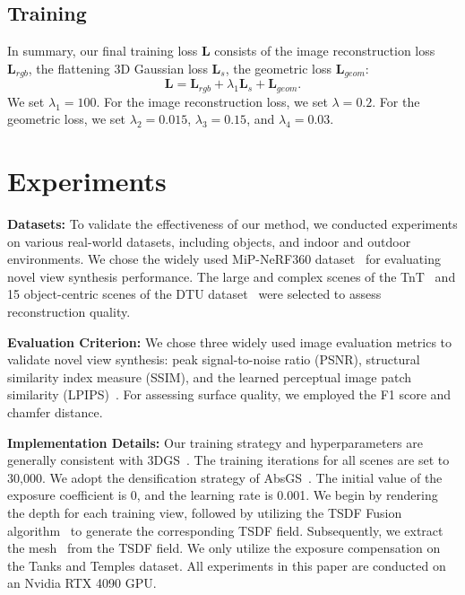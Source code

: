 \documentclass[lettersize,journal]{IEEEtran}
\begin{document}
\subsection{Training}
In summary, our final training loss $\bm{L}$ consists of the image reconstruction loss $\bm{L}_{rgb}$, the flattening 3D Gaussian loss $\bm{L}_{s}$, the geometric loss $\bm{L}_{geom}$:
\begin{equation}
    \bm{L}=\bm{L}_{rgb}+\lambda_1\bm{L}_{s}+\bm{L}_{geom}.
\end{equation}
We set $\lambda_1=100$. For the image reconstruction loss, we set $\lambda=0.2$. For the geometric loss, we set $\lambda_2=0.015$, $\lambda_3=0.15$, and  $\lambda_4=0.03$.



\section{Experiments}

\textbf{Datasets:} To validate the effectiveness of our method, we conducted experiments on various real-world datasets, including objects, and indoor and outdoor environments. We chose the widely used MiP-NeRF360 dataset~\cite{barron2021mip} for evaluating novel view synthesis performance. The large and complex scenes of the TnT~\cite{knapitsch2017tanks} and 15 object-centric scenes of the DTU dataset~\cite{jensen2014large} were selected to assess reconstruction quality.

\textbf{Evaluation Criterion:} We chose three widely used image evaluation metrics to validate novel view synthesis: peak signal-to-noise ratio (PSNR), structural similarity index measure (SSIM), and the learned perceptual image patch similarity (LPIPS)~\cite{zhang2018unreasonable}. For assessing surface quality, we employed the F1 score and chamfer distance.

\textbf{Implementation Details:}
Our training strategy and hyperparameters are generally consistent with 3DGS~\cite{kerbl20233d}. The training iterations for all scenes are set to 30,000. 
We adopt the densification strategy of AbsGS~\cite{ye2024absgs}. The initial value of the exposure coefficient is 0, and the learning rate is 0.001. We begin by rendering the depth for each training view, followed by utilizing the TSDF Fusion algorithm~\cite{newcombe2011kinectfusion} to generate the corresponding TSDF field. Subsequently, we extract the mesh~\cite{lorensen1998marching} from the TSDF field. We only utilize the exposure compensation on the Tanks and Temples dataset. All experiments in this paper are conducted on an Nvidia RTX 4090 GPU.
\end{document}
